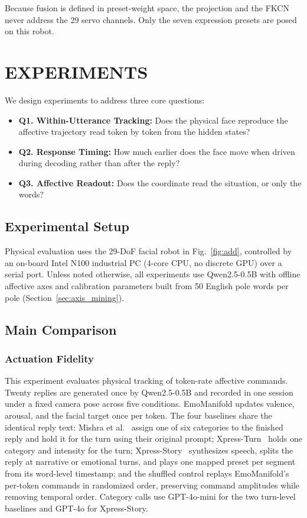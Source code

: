 \documentclass[letterpaper, 10 pt, conference]{ieeeconf/ieeeconf}
\begin{document}
Because fusion is defined in preset-weight space, the projection and the FKCN never address the 29 servo channels. Only the seven expression presets are posed on this robot.

\section{EXPERIMENTS}
\label{sec:experiments}

We design experiments to address three core questions:
\begin{itemize}
\item \textbf{Q1. Within-Utterance Tracking:} Does the physical face reproduce the affective trajectory read token by token from the hidden states?
\item \textbf{Q2. Response Timing:} How much earlier does the face move when driven during decoding rather than after the reply?
\item \textbf{Q3. Affective Readout:} Does the coordinate read the situation, or only the words?
\end{itemize}

\subsection{Experimental Setup}

Physical evaluation uses the 29-DoF facial robot in Fig.~\ref{fig:add}, controlled by an on-board Intel N100 industrial PC (4-core CPU, no discrete GPU) over a serial port. Unless noted otherwise, all experiments use Qwen2.5-0.5B with offline affective axes and calibration parameters built from 50 English pole words per pole (Section~\ref{sec:axis_mining}).

\subsection{Main Comparison}
\label{sec:exp_hardware}

\subsubsection{Actuation Fidelity}
This experiment evaluates physical tracking of token-rate affective commands. Twenty replies are generated once by Qwen2.5-0.5B and recorded in one session under a fixed camera pose across five conditions. EmoManifold updates valence, arousal, and the facial target once per token. The four baselines share the identical reply text: Mishra et al.~\cite{mishra2023realtime} assign one of six categories to the finished reply and hold it for the turn using their original prompt; Xpress-Turn~\cite{antony2025xpress} holds one category and intensity for the turn; Xpress-Story~\cite{antony2025xpress} synthesizes speech, splits the reply at narrative or emotional turns, and plays one mapped preset per segment from its word-level timestamp; and the shuffled control replays EmoManifold's per-token commands in randomized order, preserving command amplitudes while removing temporal order. Category calls use GPT-4o-mini for the two turn-level baselines and GPT-4o for Xpress-Story.
\end{document}
